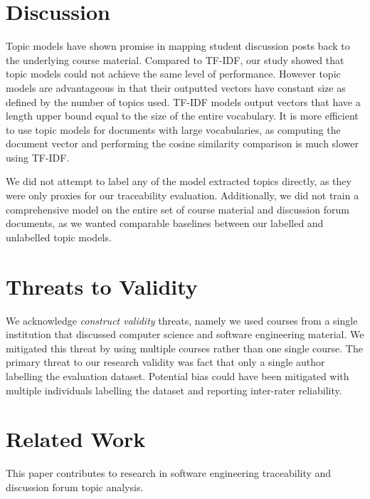 \documentclass[sigconf, nonacm=true]{acmart}
\begin{document}
\section{Discussion}
Topic models have shown promise in mapping student discussion posts back to the underlying course material.
Compared to TF-IDF, our study showed that topic models could not achieve the same level of performance.
However topic models are advantageous in that their outputted vectors have constant size as defined by the number of topics used.
TF-IDF models output vectors that have a length upper bound equal to the size of the entire vocabulary.
It is more efficient to use topic models for documents with large vocabularies, as computing the document vector and performing the cosine similarity comparison is much slower using TF-IDF.

We did not attempt to label any of the model extracted topics directly, as they were only proxies for our traceability evaluation.
Additionally, we did not train a comprehensive model on the entire set of course material and discussion forum documents, as we wanted comparable baselines between our labelled and unlabelled topic models.

\section{Threats to Validity}
We acknowledge \textit{construct validity} threats, namely we used courses from a single institution that discussed computer science and software engineering material. We mitigated this threat by using multiple courses rather than one single course.
The primary threat to our research validity was fact that only a single author labelling the evaluation dataset.
Potential bias could have been mitigated with multiple individuals labelling the dataset and reporting inter-rater reliability.

\section{Related Work}
This paper contributes to research in software engineering traceability and discussion forum topic analysis.
\end{document}
